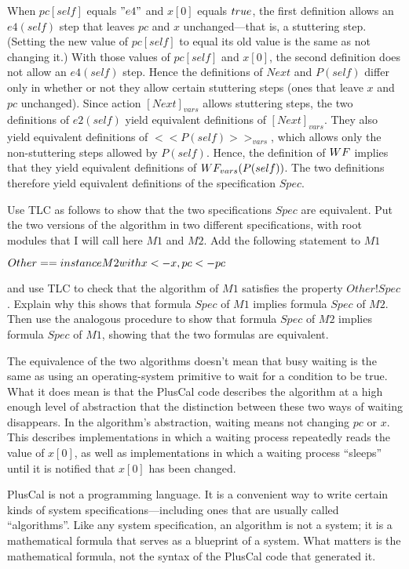 \documentclass[fleqn,leqno]{article}
\begin{document}
When $pc[self]$ equals $"e4"$ and $x[0]$ equals $\TRUE$, the first
definition allows an $e4(self)$ step that leaves $pc$ and $x$
unchanged---that is, a stuttering step.  (Setting the new value of
$pc[self]$ to equal its old value is the same as not changing it.)
With those values of $pc[self]$ and $x[0]$, the second definition does
not allow an $e4(self)$ step.  Hence the definitions of $Next$ and
$P(self)$ differ only in whether or not they allow certain stuttering
steps (ones that leave $x$ and $pc$ unchanged).  Since action
$[Next]_{vars}$ allows stuttering steps, the two definitions of
$e2(self)$ yield equivalent definitions of $[Next]_{vars}$.  They also
yield equivalent definitions of $<<P(self)>>_{vars}$, which allows
only the non-stuttering steps allowed by $P(self)$.  Hence, the
definition of $\WF$ implies that they yield equivalent definitions of
$\WF_{vars}(P(self))$.  The two definitions therefore yield equivalent
definitions of the specification $Spec$.

\begin{problem}
Use TLC as follows to show that the two specifications $Spec$ are
equivalent.  Put the two versions of the algorithm in two different
specifications, with root modules that I will call here $M1$ and $M2$.
Add the following statement to $M1$
\begin{display}
$Other == \INSTANCE M2 \WITH x <- x, pc <- pc$
\end{display}
and use TLC to check that the algorithm of $M1$ satisfies the property
$Other!Spec$.  Explain why this shows that formula $Spec$ of $M1$
implies formula $Spec$ of $M2$.  Then use the analogous procedure
to show that formula $Spec$ of $M2$ implies formula $Spec$ of $M1$,
showing that the two formulas are equivalent.
\end{problem}
%
The equivalence of the two algorithms doesn't mean that busy waiting
is the same as using an operating-system primitive to wait for a
condition to be true.  What it does mean is that the PlusCal code
describes the algorithm at a high enough level of abstraction that the
distinction between these two ways of waiting disappears.  In the
algorithm's abstraction, waiting means not changing $pc$ or $x$.  This
describes implementations in which a waiting process repeatedly reads
the value of $x[0]$, as well as implementations in which a waiting
process ``sleeps'' until it is notified that $x[0]$ has been changed.

PlusCal is not a programming language.  It is a convenient way to
write certain kinds of system specifications---including ones that are
usually called ``algorithms''.  Like any system specification, an
algorithm is not a system; it is a mathematical formula that serves as
a blueprint of a system.  What matters is the mathematical formula,
not the syntax of the PlusCal code that generated it.
\end{document}

